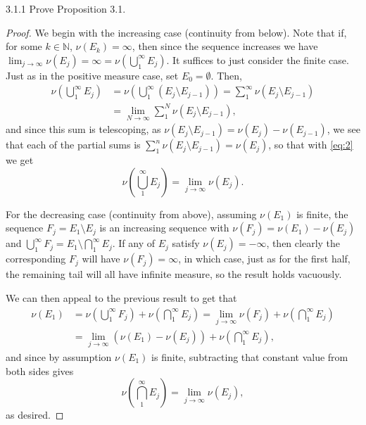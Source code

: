 \documentclass[11pt]{article}
\begin{document}
\begin{problem}{3.1.1}
Prove Proposition 3.1.
\end{problem}
\begin{proof}
  We begin with the increasing case (continuity from below).
  Note that if, for some \( k \in \mathbb{N} \), \( \nu(E_k) = \infty\), then since the sequence increases we have \( \lim_{j\rightarrow \infty} \nu(E_j) = \infty = \nu(\bigcup_1^{\infty}E_j)\).
  It suffices to just consider the finite case.
  Just as in the positive measure case, set \( E_0 = \emptyset \).
  Then,
  \begin{equation}
  \label{eq:2}
  \begin{aligned}
    \nu(\bigcup_1^{\infty} E_j) &= \nu(\bigcup_1^{\infty} (E_j \setminus E_{j-1})) = \sum\limits_1^{\infty} \nu(E_j \setminus E_{j-1}) \\
    &= \lim_{N \rightarrow \infty} \sum\limits_1^N \nu(E_j \setminus E_{j-1}),
  \end{aligned}
\end{equation}
and since this sum is telescoping, as \( \nu(E_j \setminus E_{j-1}) = \nu(E_j) - \nu(E_{j-1}) \), we see that each of the partial sums is \( \sum\limits_1^n \nu(E_j \setminus E_{j-1}) = \nu(E_j) \), so that with \cref{eq:2} we get
\begin{equation}
\label{eq:3}
\nu(\bigcup_1^{\infty} E_j) = \lim_{j\rightarrow\infty} \nu(E_j).
\end{equation}

For the decreasing case (continuity from above), assuming \( \nu(E_1) \) is finite, the sequence \( F_j = E_1 \setminus E_j \) is an increasing sequence with \(\nu(F_j) = \nu(E_1) - \nu(E_j)\) and \( \bigcup_1^{\infty} F_j = E_1 \setminus \bigcap_1^{\infty} E_j\).
If any of \( E_{j} \) satisfy \( \nu(E_j) = -\infty \), then clearly the corresponding \( F_j \) will have \( \nu(F_j) = \infty \), in which case, just as for the first half, the remaining tail will all have infinite measure, so the result holds vacuously.

We can then appeal to the previous result to get that
\begin{equation}
\label{eq:12}
\begin{aligned}
  \nu(E_1) &= \nu(\bigcup_1^{\infty} F_j) + \nu(\bigcap_1^{\infty} E_j) = \lim_{j \rightarrow \infty} \nu(F_j) + \nu(\bigcap_1^{\infty} E_j) \\
  &= \lim_{j \rightarrow \infty} (\nu(E_1) - \nu(E_j)) + \nu(\bigcap_1^{\infty} E_j),
\end{aligned}
\end{equation}
and since by assumption \(\nu(E_1) \) is finite, subtracting that constant value from both sides gives
\begin{equation}
\label{eq:13}
\nu(\bigcap_1^{\infty} E_j) = \lim_{j\rightarrow \infty} \nu(E_j),
\end{equation}
as desired.
\end{proof}
\end{document}

